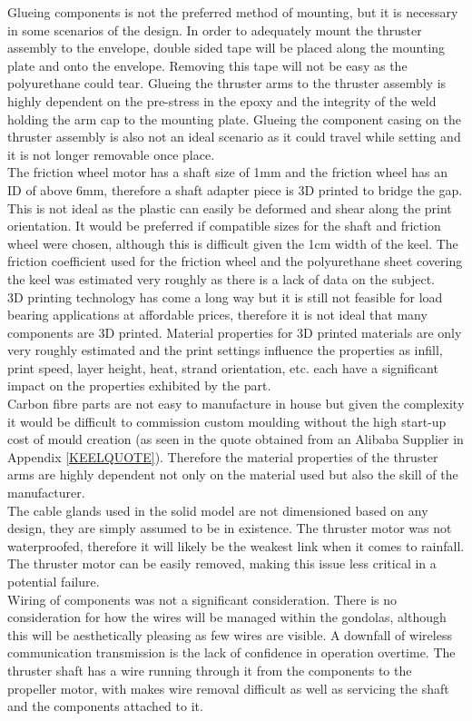 \documentclass[../main.tex]{subfiles}
\begin{document}
Glueing components is not the preferred method of mounting, but it is necessary in some scenarios of the design. In order to adequately mount the thruster assembly to the envelope, double sided tape will be placed along the mounting plate and onto the envelope. Removing this tape will not be easy as the polyurethane could tear. Glueing the thruster arms to the thruster assembly is highly dependent on the pre-stress in the epoxy and the integrity of the weld holding the arm cap to the mounting plate. Glueing the component casing on the thruster assembly is also not an ideal scenario as it could travel while setting and it is not longer removable once place.\\

The friction wheel motor has a shaft size of 1mm and the friction wheel has an ID of above 6mm, therefore a shaft adapter piece is 3D printed to bridge the gap. This is not ideal as the plastic can easily be deformed and shear along the print orientation. It would be preferred if compatible sizes for the shaft and friction wheel were chosen, although this is difficult given the 1cm width of the keel. The friction coefficient used for the friction wheel and the polyurethane sheet covering the keel was estimated very roughly as there is a lack of data on the subject.\\

3D printing technology has come a long way but it is still not feasible for load bearing applications at affordable prices, therefore it is not ideal that many components are 3D printed. Material properties for 3D printed materials are only very roughly estimated and the print settings influence the properties as infill, print speed, layer height, heat, strand orientation, etc. each have a significant impact on the properties exhibited by the part.\\

Carbon fibre parts are not easy to manufacture in house but given the complexity it would be difficult to commission custom moulding without the high start-up cost of mould creation (as seen in the quote obtained from an Alibaba Supplier in Appendix \ref{KEELQUOTE}). Therefore the material properties of the thruster arms are highly dependent not only on the material used but also the skill of the manufacturer.\\

The cable glands used in the solid model are not dimensioned based on any design, they are simply assumed to be in existence. The thruster motor was not waterproofed, therefore it will likely be the weakest link when it comes to rainfall. The thruster motor can be easily removed, making this issue less critical in a potential failure. \\

Wiring of components was not a significant consideration. There is no consideration for how the wires will be managed within the gondolas, although this will be aesthetically pleasing as few wires are visible. A downfall of wireless communication transmission is the lack of confidence in operation overtime. The thruster shaft has a wire running through it from the components to the propeller motor, with makes wire removal difficult as well as servicing the shaft and the components attached to it.\\
\end{document}
